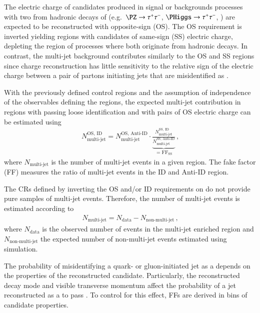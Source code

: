 The electric charge of \tauhadvis candidates produced in signal or backgrounds
processes with two \tauhadvis from hadronic decays of \tauleptons (e.g.\
$\PZ \to \tautau$, $\PHiggs \to \tautau$, \ttbar) are expected to be
reconstructed with opposite-sign (OS). The OS requirement is inverted yielding
regions with \tauhadvis candidates of same-sign (SS) electric charge, depleting
the region of processes where both \tauhadvis originate from hadronic \taulepton
decays. In contrast, the multi-jet background contributes similarly to the OS
and SS regions since \tauhadvis charge reconstruction has little sensitivity to
the relative sign of the electric charge between a pair of partons initiating
jets that are misidentified as \tauhadvis.

With the previously defined control regions and the assumption of independence
of the observables defining the regions, the expected multi-jet contribution in
regions with \tauhadvis passing loose identification and with \tauhadvis pairs
of OS electric charge can be estimated using
\begin{align*}
  N_\text{multi-jet}^{\text{OS, ID}} =
  N_\text{multi-jet}^{\text{OS, Anti-ID}}
  \cdot
  \underbrace{\frac{N_\text{multi-jet}^{\text{SS, ID}}}
  {N_\text{multi-jet}^{\text{SS, Anti-ID}}}}
  _{= \text{FF}_{\text{SS}}} \,\text{,}
\end{align*}
where $N_\text{multi-jet}$ is the number of multi-jet events in a given
region. The fake factor (FF) measures the ratio of multi-jet events in the ID
and Anti-ID region.%

The CRs defined by inverting the OS and/or ID requirements on \tauhadvis do not
provide pure samples of multi-jet events. Therefore, the number of multi-jet
events is estimated according to
\begin{align*}
  N_\text{multi-jet} = N_\text{data} - N_\text{non-multi-jet} \,\text{,}
\end{align*}
where $N_\text{data}$ is the observed number of events in the
multi-jet enriched region and $N_\text{non-multi-jet}$ the expected
number of non-multi-jet events estimated using simulation.

The probability of misidentifying a quark- or gluon-initiated jet as a
\tauhadvis depends on the properties of the reconstructed \tauhadvis
candidate. Particularly, the reconstructed decay mode and visible transverse
momentum affect the probability of a jet reconstructed as a \tauhadvis to pass
\tauid. To control for this effect, FFs are derived in bins of \tauhadvis
candidate properties.

